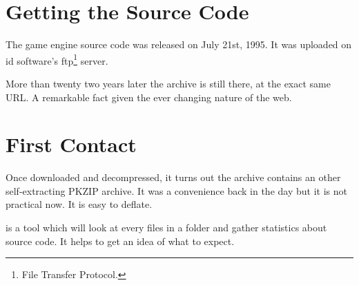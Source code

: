\documentclass[book.tex]{subfiles}
\begin{document}
\section{Getting the Source Code}
The game engine source code was released on July 21st, 1995. It was uploaded on id software's ftp\footnote{File Transfer Protocol.} server.\\ 
\par
\begin{minipage}{\textwidth}

\end{minipage}
\par
More than twenty two years later the archive is still there, at the exact same URL. A remarkable fact given the ever changing nature of the web.\\

\section{First Contact}
Once downloaded and decompressed, it turns out the archive  contains an other self-extracting PKZIP archive. It was a convenience back in the day but it is not practical now. It is easy to deflate.\\
\par
\begin{minipage}{\textwidth}

\end{minipage}

\par
{} is a tool which will look at every files in a folder and gather statistics about source code. It helps to get an idea of what to expect.\\
\par

\begin{minipage}{\textwidth}

\end{minipage}
\end{document}
